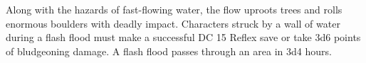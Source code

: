 Along with the hazards of fast-flowing water, the flow uproots trees and rolls enormous boulders with deadly impact. Characters struck by a wall of water during a flash flood must make a successful DC 15 Reflex save or take 3d6 points of bludgeoning damage. A flash flood passes through an area in 3d4 hours.




